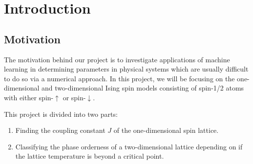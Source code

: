 \section{Introduction}

\subsection{Motivation}

The motivation behind our project is to investigate applications of machine learning in determining parameters in physical systems which are usually difficult to do so via a numerical approach.
In this project, we will be focusing on the one-dimensional and two-dimensional Ising spin models consisting of spin-1/2 atoms with either spin-\( \uparrow \) or spin-\( \downarrow \).

This project is divided into two parts:

\begin{enumerate}
    \item Finding the coupling constant \( J \) of the one-dimensional spin lattice.
    \item Classifying the phase orderness of a two-dimensional lattice depending on if the lattice temperature is beyond a critical point.
\end{enumerate}
